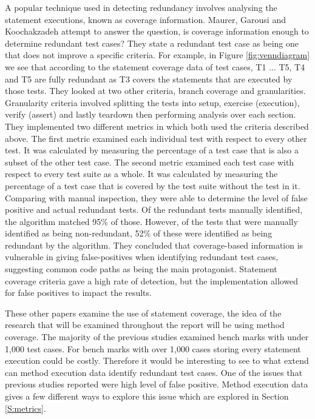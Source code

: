 A popular technique used in detecting redundancy involves analysing the statement executions, known as coverage information. Maurer, Garousi and Koochakzadeh \cite{koochakzadeh2009test} attempt to answer the question, is coverage information enough to determine redundant test cases? They state a redundant test case as being one that does not improve a specific criteria. For example, in Figure \ref{fig:venndiagram} we see that according to the statement coverage data of test cases, T1 ... T5, T4 and T5 are fully redundant as T3 covers the statements that are executed by those tests. They looked at two other criteria, branch coverage and granularities. Granularity criteria involved splitting the tests into setup, exercise (execution), verify (assert) and lastly teardown then performing analysis over each section. They implemented two different metrics in which both used the criteria described above. The first metric examined each individual test with respect to every other test. It was calculated by measuring the percentage of a test case that is also a subset of the other test case. The second metric examined each test case with respect to every test suite as a whole. It was calculated by measuring the percentage of a test case that is covered by the test suite without the test in it. Comparing with manual inspection, they were able to determine the level of false positive and actual redundant tests. Of the redundant tests manually identified, the algorithm matched 95\% of those. However, of the tests that were manually identified as being non-redundant, 52\% of these were identified as being redundant by the algorithm. They concluded that coverage-based information is vulnerable in giving false-positives when identifying redundant test cases, suggesting common code paths as being the main protagonist. Statement coverage criteria gave a high rate of detection, but the implementation allowed for false positives to impact the results. 

These other papers examine the use of statement coverage, the idea of the research that will be examined throughout the report will be using method coverage. The majority of the previous studies examined bench marks with under 1,000 test cases. For bench marks with over 1,000 cases storing every statement execution could be costly. Therefore it would be interesting to see to what extend can method execution data identify redundant test cases. One of the issues that previous studies reported were high level of false positive. Method execution data gives a few different ways to explore this issue which are explored in Section \ref{S:metrics}.

